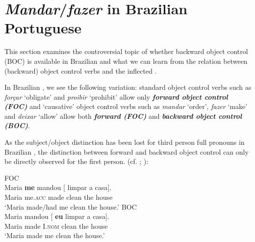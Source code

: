 \documentclass[output=paper]{langsci/langscibook}
\begin{document}
\section{\textit{Mandar}/\textit{fazer} in Brazilian Portuguese}%

This section examines the controversial topic of whether backward object control (BOC) is available in Brazilian  and what we can learn from the relation between (backward) object control verbs and the inflected .

In Brazilian , we see the following variation: standard object control verbs such as \textit{forçar} ‘obligate’ and \textit{proibir} ‘prohibit’ allow only \textbf{\textit{forw}}\textbf{\textit{ard object control (FOC)}}  and ‘causative’ object control verbs such as \textit{mandar} ‘order’, \textit{fazer} ‘make’ and \textit{deixar} ‘allow’ allow both \textbf{\textit{forward (FOC)}} and \textbf{\textit{backward object control (BOC)}}.  

As the subject\slash object distinction has been lost for third person full pronouns in Brazilian , the distinction between forward and backward object control can only be directly observed for the first person. (cf. \citealt{Farrell1995}; \citealt{Boeckx2004,Boeckx2006}):

\ea%
    \label{ex:moreno:5}
    \z
\z    



\ea%
    \label{ex:moreno:6}
    \ea  FOC\\
    \gll Maria  \textbf{me}        mandou  [ limpar a    casa].      \\
         Maria  me.\textsc{acc} made     {}  clean   the house\\
    \glt ‘Maria made/had me clean the house.’
    \ex  BOC \\
    \gll Maria mandou [ \textbf{eu}        limpar a   casa].      \\
         Maria made     {}  I.\textsc{nom}  clean  the house\\
    \glt ‘Maria made me clean the house.’
    \z
\z    
\end{document}
